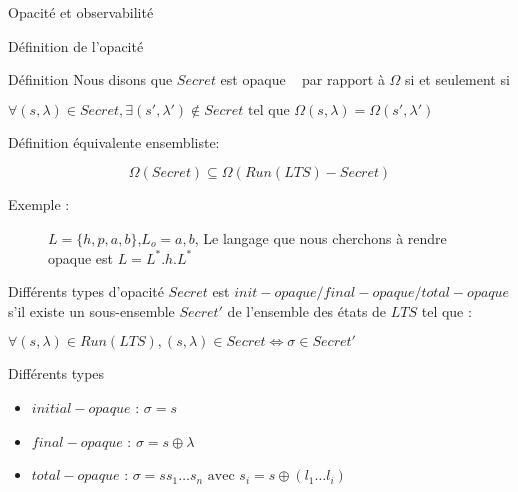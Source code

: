 \documentclass[11pt]{beamer}
\begin{document}
\begin{section}{Opacit\'e et observabilit\'e}
\begin{frame}{D\'efinition de l'opacit\'e}
\begin{block}{D\'efinition}
     Nous disons que $Secret$ est opaque ~\cite{BryansKMR08} par rapport \`a $\Omega$ si et seulement si
	
	$\forall (s,\lambda) \in Secret, \exists (s',\lambda')\not\in Secret \mbox{ tel que } \Omega(s,\lambda) = \Omega (s',\lambda')$
	
	D\'efinition \'equivalente ensembliste:
	
	$$\Omega(Secret)\subseteq \Omega(Run(LTS)-Secret)$$
    \end{block}
  \end{frame}
  
  \begin{frame}{Exemple :}
    \begin{figure}[H]
                \centering
                \caption{$L = \{h,p,a,b\}$,$L_o = {a,b}$, Le langage que nous cherchons \`a rendre opaque est $L = L^*.h.L^*$}
		\end{figure}		
   
  \end{frame}

  
  \begin{frame}{Diff\'erents types d'opacit\'e}
    $Secret$ est $init-opaque/final-opaque/total-opaque$ s'il existe un sous-ensemble  $Secret'$ de l'ensemble des \'etats de $LTS$ tel que :
    
    $\forall (s,\lambda) \in Run(LTS), (s, \lambda) \in Secret \Leftrightarrow \sigma \in Secret'$
    
    \begin{block}{Diff\'erents types}
      \begin{itemize}
	\item $initial-opaque$ : $\sigma = s$
	\item $final-opaque$ : $\sigma = s\oplus \lambda$
	\item $total-opaque$ : $\sigma = s s_1 \dots s_n \mbox{ avec } s_i = s\oplus(l_1\dots l_i)$
      \end{itemize} 


\end{block}
\end{frame}
\end{section}
\end{document}
